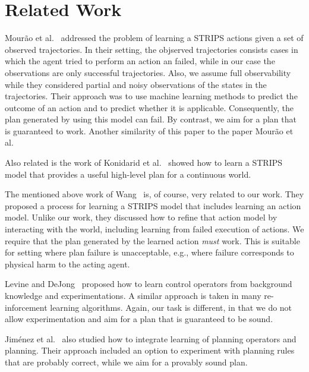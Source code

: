 \documentclass[letterpaper]{article}
\begin{document}
\section{Related Work}
Mour{\~{a}}o et al.~ addressed the problem of learning a STRIPS actions given a set of observed trajectories. In their setting, the objserved trajectories consists cases in which the agent tried to perform an action an failed, while in our case the observations are only successful trajectories. Also, we assume full observability while they considered partial and noisy observations of the states in the trajectories. Their approach was to use machine learning methods to predict the outcome of an action and to predict whether it is applicable. Consequently, the plan generated by using this model can fail. By contrast, we aim for a plan that is guaranteed to work. Another similarity of this paper to the paper Mour{\~{a}}o et al.~ 

Also related is the work of Konidarid et al.~ showed how to learn a STRIPS model that provides a useful high-level plan for a continuous world. 


The mentioned above work of Wang~ is, of course, very related to our work. 
They proposed a process for learning a STRIPS model that includes learning an action model. Unlike our work, they discussed how to refine that action model by interacting with the world, including learning from failed 
execution of actions.  We require that the plan generated by the learned action {\em must} work. This is suitable for setting where plan failure is unacceptable, e.g., where failure corresponds to physical harm to the acting agent.  


Levine and DeJong~ proposed how to learn control operators 
from background knowledge and experimentations. A similar approach is taken in many re-inforcement learning algorithms. Again, our task is different, in that we do not allow experimentation and aim for a plan that is guaranteed to be sound.

Jim{\'e}nez et al.~ also studied how to integrate learning of planning operators and planning. Their approach included an option to experiment with planning rules that are probably correct, while we aim for a provably sound plan. 
\end{document}
